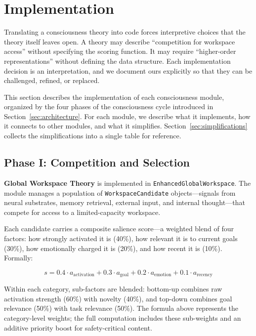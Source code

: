 \section{Implementation}
\label{sec:implementation}

Translating a consciousness theory into code forces interpretive choices that the theory itself leaves open. A theory may describe ``competition for workspace access'' without specifying the scoring function. It may require ``higher-order representations'' without defining the data structure. Each implementation decision is an interpretation, and we document ours explicitly so that they can be challenged, refined, or replaced.

This section describes the implementation of each consciousness module, organized by the four phases of the consciousness cycle introduced in Section~\ref{sec:architecture}. For each module, we describe what it implements, how it connects to other modules, and what it simplifies. Section~\ref{sec:simplifications} collects the simplifications into a single table for reference.

\subsection{Phase I: Competition and Selection}

\textbf{Global Workspace Theory} is implemented in \texttt{EnhancedGlobalWorkspace}. The module manages a population of \texttt{WorkspaceCandidate} objects---signals from neural substrates, memory retrieval, external input, and internal thought---that compete for access to a limited-capacity workspace.

Each candidate carries a composite salience score---a weighted blend of four factors: how strongly activated it is (40\%), how relevant it is to current goals (30\%), how emotionally charged it is (20\%), and how recent it is (10\%). Formally:

\begin{equation}
s = 0.4 \cdot a_{\text{activation}} + 0.3 \cdot a_{\text{goal}} + 0.2 \cdot a_{\text{emotion}} + 0.1 \cdot a_{\text{recency}}
\label{eq:salience}
\end{equation}

Within each category, sub-factors are blended: bottom-up combines raw activation strength (60\%) with novelty (40\%), and top-down combines goal relevance (50\%) with task relevance (50\%). The formula above represents the category-level weights; the full computation includes these sub-weights and an additive priority boost for safety-critical content.

